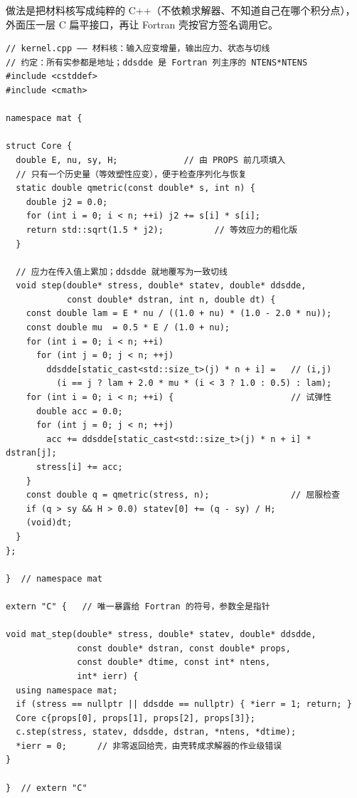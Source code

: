 \documentclass[12pt,a4paper,fontset=fandol]{ctexbook}
\newcommand{\Lang}[1]{\textsf{#1}}
\newcommand{\CL}{\Lang{C}}
\newcommand{\CPP}{\Lang{C++}}
\begin{document}
做法是把材料核写成纯粹的 \CPP{}（不依赖求解器、不知道自己在哪个积分点），
外面压一层 \CL{} 扁平接口，再让 Fortran 壳按官方签名调用它。

\begin{lstlisting}[style=cppstyle, caption={材料核（\CPP{}）加 \CL{} 扁平接口：
被 Fortran 壳调用的那一侧}, label={lst:ch05-cpp-kernel}]
// kernel.cpp —— 材料核：输入应变增量，输出应力、状态与切线
// 约定：所有实参都是地址；ddsdde 是 Fortran 列主序的 NTENS*NTENS
#include <cstddef>
#include <cmath>

namespace mat {

struct Core {
  double E, nu, sy, H;             // 由 PROPS 前几项填入
  // 只有一个历史量（等效塑性应变），便于检查序列化与恢复
  static double qmetric(const double* s, int n) {
    double j2 = 0.0;
    for (int i = 0; i < n; ++i) j2 += s[i] * s[i];
    return std::sqrt(1.5 * j2);          // 等效应力的粗化版
  }

  // 应力在传入值上累加；ddsdde 就地覆写为一致切线
  void step(double* stress, double* statev, double* ddsdde,
            const double* dstran, int n, double dt) {
    const double lam = E * nu / ((1.0 + nu) * (1.0 - 2.0 * nu));
    const double mu  = 0.5 * E / (1.0 + nu);
    for (int i = 0; i < n; ++i)
      for (int j = 0; j < n; ++j)
        ddsdde[static_cast<std::size_t>(j) * n + i] =   // (i,j)
          (i == j ? lam + 2.0 * mu * (i < 3 ? 1.0 : 0.5) : lam);
    for (int i = 0; i < n; ++i) {                       // 试弹性
      double acc = 0.0;
      for (int j = 0; j < n; ++j)
        acc += ddsdde[static_cast<std::size_t>(j) * n + i] * dstran[j];
      stress[i] += acc;
    }
    const double q = qmetric(stress, n);                // 屈服检查
    if (q > sy && H > 0.0) statev[0] += (q - sy) / H;
    (void)dt;
  }
};

}  // namespace mat

extern "C" {   // 唯一暴露给 Fortran 的符号，参数全是指针

void mat_step(double* stress, double* statev, double* ddsdde,
              const double* dstran, const double* props,
              const double* dtime, const int* ntens,
              int* ierr) {
  using namespace mat;
  if (stress == nullptr || ddsdde == nullptr) { *ierr = 1; return; }
  Core c{props[0], props[1], props[2], props[3]};
  c.step(stress, statev, ddsdde, dstran, *ntens, *dtime);
  *ierr = 0;      // 非零返回给壳，由壳转成求解器的作业级错误
}

}  // extern "C"
\end{lstlisting}
\end{document}
